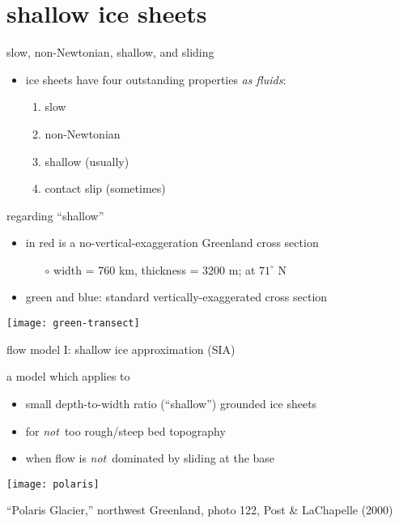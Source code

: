 
\section{shallow ice sheets}

\begin{frame}{slow, non-Newtonian, shallow, and sliding}

\begin{itemize}
\item ice sheets have four outstanding properties \emph{as fluids}:
  \begin{enumerate}
  \item slow
  \item non-Newtonian
  \item shallow (usually)
  \item contact slip (sometimes)
  \end{enumerate}
\end{itemize}
\end{frame}


\begin{frame}{regarding ``shallow''}

\begin{itemize}
\item in \alert{red} is a no-vertical-exaggeration Greenland cross section
  \begin{itemize}
  \item[$\circ$] width = 760 km, thickness = 3200 m; at $71^\circ$ N
  \end{itemize}
\item green and blue: standard vertically-exaggerated cross section
\end{itemize}

\begin{center}
  \texttt{[image: green-transect]}
\end{center}
\end{frame}


\begin{frame}{flow model I: shallow ice approximation (SIA)}

a model which applies to
\begin{itemize}
\item small depth-to-width ratio (``shallow'') grounded ice sheets
\item for \emph{not}\, too rough/steep bed topography
\item when flow is \emph{not}\, dominated by sliding at the base
\end{itemize}

\begin{center}
  \texttt{[image: polaris]}

\tiny ``Polaris Glacier,'' northwest Greenland, photo 122, Post \& LaChapelle (2000)
\end{center}

\end{frame}


